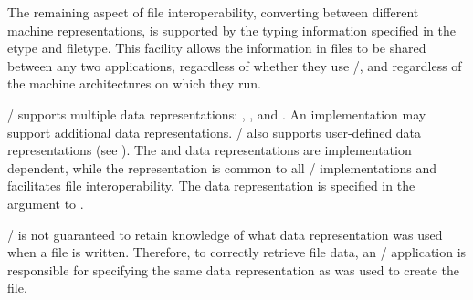 The remaining aspect of file interoperability,
converting between different machine representations,
is supported
by the typing information specified 
in the etype and filetype.
This facility allows the information in files to be
shared between any two applications,
regardless of whether they use \MPI/,
and regardless of the machine architectures on which they run.

\MPI/ supports multiple data representations:
, , and .
An implementation may support additional data representations.
\MPI/ also supports user-defined data representations
(see ).
The
 and 
data representations are implementation dependent,
while the
representation is
common to all \MPI/ implementations
and facilitates file interoperability.
The data representation is specified in the  argument
to .

\begin{users}
\MPI/ is not
guaranteed to retain knowledge of what data
representation was used when a file is written.
Therefore, to correctly retrieve file data, an \MPI/
application is responsible for specifying the same data
representation as was used to create the file. 
\end{users}

